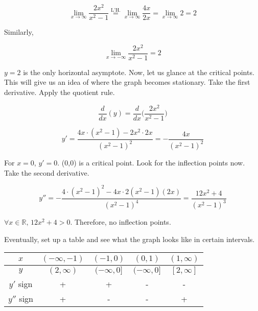 \documentclass{article}
\begin{document}
\begin{equation*}\lim_{x\to \infty} \frac{2x^2}{x^2-1} \overset{\text{L'H.}}{=} \lim_{x\to \infty} \frac{4x}{2x} = \lim_{x\to \infty} 2 = 2\end{equation*}

\noindent Similarly,

\begin{equation*}\lim_{x\to -\infty} \frac{2x^2}{x^2-1} = 2\end{equation*}

\hfill

\noindent $y=2$ is the only horizontal asymptote. Now, let us glance at the critical points. This will give us an idea of where the graph becomes stationary. Take the first derivative. Apply the quotient rule.

\begin{equation*}\frac{d}{dx}(y) = \frac{d}{dx}\Big(\frac{2x^2}{x^2-1}\Big)\end{equation*}

\begin{equation*}y' = \frac{4x\cdot(x^2-1) - 2x^2 \cdot 2x}{(x^2-1)^2} = -\frac{4x}{(x^2-1)^2} \end{equation*}

\hfill

\noindent For $x=0$, $y'=0$. (0,0) is a critical point. Look for the inflection points now. Take the second derivative.

\begin{equation*}y'' = -\frac{4\cdot (x^2-1)^2 - 4x \cdot 2(x^2-1)(2x)}{(x^2-1)^4} = \frac{12x^2+4}{(x^2-1)^3} \end{equation*}

\hfill

\noindent $\forall x \in \mathbb{R},\,12x^2+4 > 0$. Therefore, no inflection points.

\hfill

\noindent Eventually, set up a table and see what the graph looks like in certain intervals.

\begin{center}
    \large
    \begin{tabular}{ |c| c c c c| } 
    \hline
        $x$ & $(-\infty, -1)$ & $(-1, 0)$ & $(0, 1)$ &  $(1, \infty)$ \\
        \hline
        $y$ & $(2, \infty)$ & $(-\infty, 0]$ & $(-\infty, 0]$ & $[2, \infty]$\\
        \hline
        $y'$ sign & + & + & - & - \\
        \hline
        $y''$ sign & + & - & - & + \\
        \hline
    \end{tabular}
\end{center}
\end{document}
